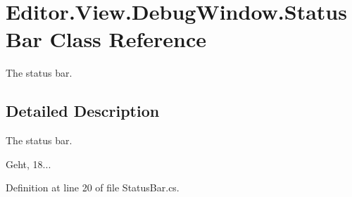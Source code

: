 \section{Editor.\-View.\-Debug\-Window.\-Status\-Bar Class Reference}
\label{class_editor_1_1_view_1_1_debug_window_1_1_status_bar}


The status bar.  




\subsection{Detailed Description}
The status bar. 

Geht, 18... 

Definition at line 20 of file Status\-Bar.\-cs.

